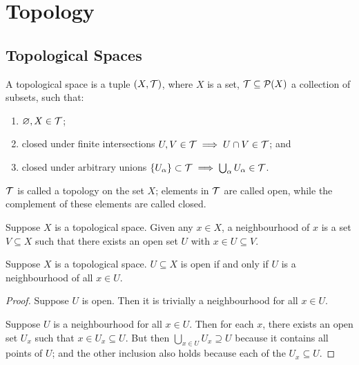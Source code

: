 \chapter{Topology}

\section{Topological Spaces}

\begin{definition}
    A topological space is a tuple \((X,\mathcal{T})\),
    where \(X\) is a set, \(\mathcal{T} \subseteq \mathcal{P}(X)\) a collection of subsets,
    such that:
    \begin{enumerate}[label={(\roman*)}, itemsep=0mm]
        \item \(\varnothing,X \in \mathcal{T}\);
        \item closed under finite intersections
            \(U,V \in \mathcal{T} \implies U \cap V \in \mathcal{T}\); and
        \item closed under arbitrary unions
            \({\{U_\alpha\}} \subset \mathcal{T} \implies \bigcup_\alpha U_\alpha \in \mathcal{T}\).
    \end{enumerate}
    \(\mathcal{T}\) is called a topology on the set \(X\);
    elements in \(\mathcal{T}\) are called open,
    while the complement of these elements are called closed.
\end{definition}
\begin{definition}
    Suppose \(X\) is a topological space.
    Given any \(x \in X\), a neighbourhood of \(x\) is a set \(V \subseteq X\)
    such that there exists an open set \(U\) with \(x \in U \subseteq V\).
\end{definition}
\begin{proposition}
    Suppose \(X\) is a topological space.
    \(U \subseteq X\) is open if and only if \(U\) is a neighbourhood of all \(x \in U\).
\end{proposition}
\begin{proof}
    Suppose \(U\) is open. Then it is trivially a neighbourhood for all \(x \in U\).

    Suppose \(U\) is a neighbourhood for all \(x \in U\).
    Then for each \(x\), there exists an open set \(U_x\) such that \(x \in U_x \subseteq U\).
    But then \(\bigcup_{x \in U} U_x \supseteq U\) because it contains all points of \(U\);
    and the other inclusion also holds because each of the \(U_x \subseteq U\).
\end{proof}

